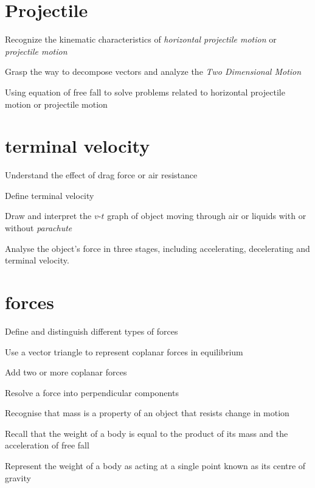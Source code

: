 \documentclass[a4paper]{tufte-handout}
\begin{document}
\section{Projectile}
\begin{todolist}
  \item Recognize the kinematic characteristics of \emph{horizontal projectile motion} or \emph{projectile motion} 
  \item Grasp the way to decompose vectors and analyze the \emph{Two Dimensional Motion}
  \item Using equation of free fall to solve problems related to horizontal projectile motion or projectile motion
\end{todolist}
\clearpage

\section{terminal velocity}
\begin{todolist}
  \item Understand the effect of drag force or air resistance
  \item Define terminal velocity
  \item Draw and interpret the $v$-$t$ graph of object moving through air or liquids with or without \emph{parachute}
  \item Analyse the object's force in three stages, including accelerating, decelerating and terminal velocity.
\end{todolist}
\clearpage

\section{forces}
\begin{todolist}
  \item Define and distinguish different types of forces
  \item Use a vector triangle to represent coplanar forces in equilibrium
  \item Add two or more coplanar forces
  \item Resolve a force into perpendicular components
  \item Recognise that mass is a property of an object that resists change in motion
  \item Recall that the weight of a body is equal to the product of its mass and the acceleration of free fall
  \item Represent the weight of a body as acting at a single point known as its centre of gravity
\end{todolist}
\clearpage
\end{document}
